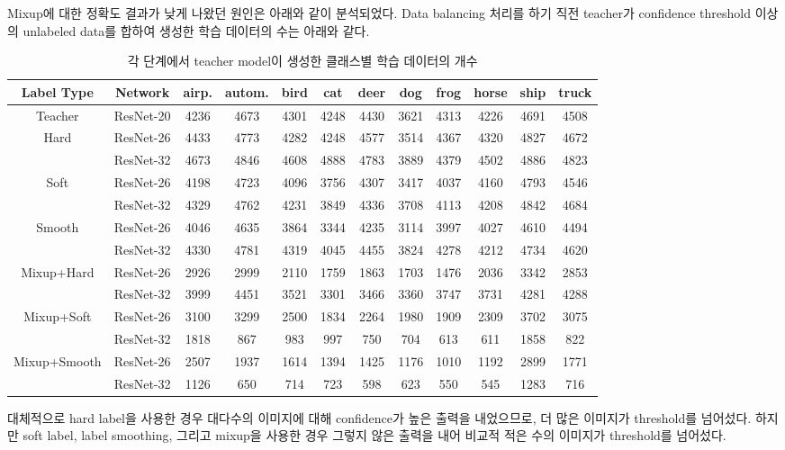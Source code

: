 \documentclass[a4paper, 10pt]{article}
\begin{document}
Mixup에 대한 정확도 결과가 낮게 나왔던 원인은 아래와 같이 분석되었다. Data
balancing 처리를 하기 직전 teacher가 confidence threshold 이상의 unlabeled
data를 합하여 생성한 학습 데이터의 수는 아래와 같다.
\begin{table}[!h]
  \center
  \begin{tabular}{|c|c|cccccccccc|}
\hline
Label Type & Network & airp. & autom. & bird & cat & deer & dog & frog & horse & ship & truck \\ \hline
Teacher & ResNet-20 & 4236 & 4673 & 4301 & 4248 & 4430 & 3621 & 4313 & 4226 & 4691 & 4508 \\ \hline
Hard & ResNet-26 & 4433 & 4773 & 4282 & 4248 & 4577 & 3514 & 4367 & 4320 & 4827 & 4672 \\
     & ResNet-32 & 4673 & 4846 & 4608 & 4888 & 4783 & 3889 & 4379 & 4502 & 4886 & 4823 \\ \hline

Soft & ResNet-26 & 4198 & 4723 & 4096 & 3756 & 4307 & 3417 & 4037 & 4160 & 4793 & 4546 \\
     & ResNet-32 & 4329 & 4762 & 4231 & 3849 & 4336 & 3708 & 4113 & 4208 & 4842 & 4684 \\ \hline

Smooth & ResNet-26 & 4046 & 4635 & 3864 & 3344 & 4235 & 3114 & 3997 & 4027 & 4610 & 4494 \\
     & ResNet-32 & 4330 & 4781 & 4319 & 4045 & 4455 & 3824 & 4278 & 4212 & 4734 & 4620 \\ \hline

Mixup+Hard & ResNet-26 & 2926 & 2999 & 2110 & 1759 & 1863 & 1703 & 1476 & 2036 & 3342 & 2853 \\
     & ResNet-32 & 3999 & 4451 & 3521 & 3301 & 3466 & 3360 & 3747 & 3731 & 4281 & 4288 \\ \hline

Mixup+Soft & ResNet-26 & 3100 & 3299 & 2500 & 1834 & 2264 & 1980 & 1909 & 2309 & 3702 & 3075 \\
     & ResNet-32 & 1818 & 867 & 983 & 997 & 750 & 704 & 613 & 611 & 1858 & 822 \\ \hline

Mixup+Smooth & ResNet-26 & 2507 & 1937 & 1614 & 1394 & 1425 & 1176 & 1010 & 1192 & 2899 & 1771 \\
     & ResNet-32 & 1126 & 650 & 714 & 723 & 598 & 623 & 550 & 545 & 1283 & 716 \\ \hline
  \end{tabular}
  \caption{각 단계에서 teacher model이 생성한 클래스별 학습 데이터의 개수}
  \label{datagen}
\end{table}
대체적으로 hard label을 사용한 경우 대다수의 이미지에 대해 confidence가 높은
출력을 내었으므로, 더 많은 이미지가 threshold를 넘어섰다. 하지만 soft label,
label smoothing, 그리고 mixup을 사용한 경우 그렇지 않은 출력을 내어 비교적 적은
수의 이미지가 threshold를 넘어섰다.
\end{document}
